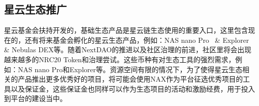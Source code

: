 \subsection{星云生态推广}
星云基金会扶持开发的，基础生态产品是星云链生态使用的重要入口，这里包含现在的，还有将来基金会孵化的星云生态产品，例如：NAS nano Pro~\cite{NASnano} \& Explorer~\cite{explorer} \& Nebulas DEX等。随着NextDAO的推进以及社区治理的前进，社区里将会出现越来越多的NRC20 Token和治理尝试。这些币种有对生态工具的强烈需求，例如：NAS nano Pro和Explorer等。资源空间有限的情况下，为了使得星云生态相关的产品推出更多优秀好的项目，将可能会使用NAX作为平台征选优秀项目的工具以及保证金，这些保证金也同样可以作为生态项目的活动和激励经费，用于投入到平台的建设当中。
